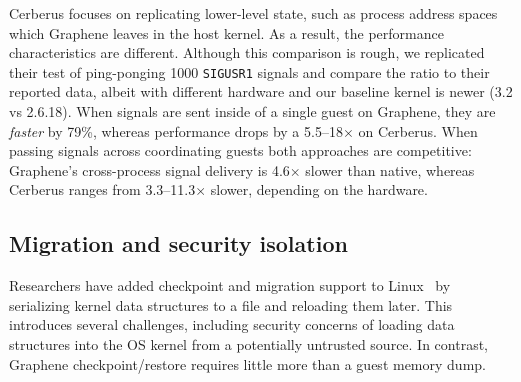 Cerberus focuses on replicating lower-level state, such as process address spaces
which Graphene leaves in the host kernel.
As a result, the performance characteristics are different.
Although this comparison is rough, 
we replicated their test of ping-ponging 1000 
{\tt SIGUSR1} signals and compare the ratio to their reported data, 
albeit with different hardware and our baseline kernel is newer 
(3.2 vs 2.6.18).  
When signals are sent inside of a single guest on Graphene, they are {\em faster}
by 79\%, whereas performance drops by a 5.5--18$\times$ on Cerberus.
When passing signals across coordinating guests both approaches are competitive:
Graphene's cross-process signal delivery is 4.6$\times$ slower than native, whereas Cerberus ranges from 
3.3--11.3$\times$ slower, depending on the hardware.



\subsection{Migration and security isolation}

Researchers have added checkpoint and migration support to Linux~\citep{linux-cr}
by serializing kernel data structures to a file
and reloading them later.  
This introduces several challenges, including
security concerns of loading data structures into the OS kernel from a potentially 
untrusted source.
In contrast, Graphene checkpoint/restore 
requires little more than a guest memory dump.


